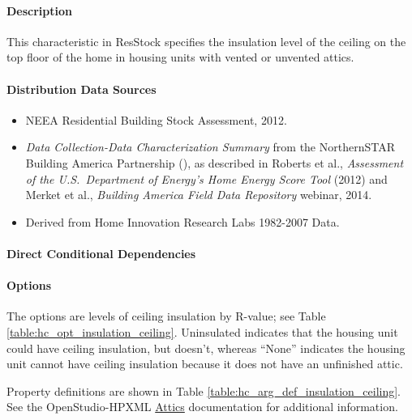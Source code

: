 \paragraph{Description}
% 
This characteristic in ResStock specifies the insulation level of the ceiling on the top floor of the home in housing units with vented or unvented attics.

\paragraph{Distribution Data Sources}
% 
\begin{itemize}

\item
  NEEA Residential Building Stock Assessment, 2012.
\item
  \textit{Data Collection-Data Characterization Summary} from the NorthernSTAR Building America Partnership (\cite{Nettleton2012}), as described in
  Roberts et al., \textit{Assessment of the U.S.~Department of
  Energy's Home Energy Score Tool} (2012)
  and Merket et al., \textit{Building America Field Data
  Repository} webinar, 2014.
\item
  Derived from Home Innovation Research Labs 1982-2007 Data.
\end{itemize}

\paragraph{Direct Conditional Dependencies}


\paragraph{Options}
The options are levels of ceiling insulation by R-value; see Table \ref{table:hc_opt_insulation_ceiling}. Uninsulated indicates that the housing unit could have ceiling insulation, but doesn't, whereas ``None'' indicates the housing unit cannot have ceiling insulation because it does not have an unfinished attic.



Property definitions are shown in Table \ref{table:hc_arg_def_insulation_ceiling}. See the OpenStudio-HPXML \href{https://openstudio-hpxml.readthedocs.io/en/v1.10.0/workflow_inputs.html#hpxml-attics}{Attics} documentation for additional information.

